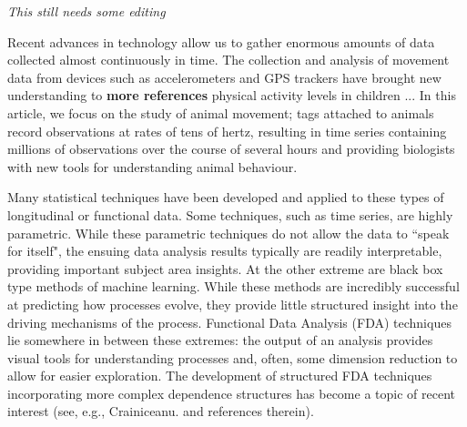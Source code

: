 


{\em{This still needs some editing}}

\vskip 10pt\noindent

Recent advances in technology allow us to gather enormous amounts of data collected almost continuously in time.
The collection and analysis of movement data from devices such as accelerometers and GPS trackers have brought new understanding to {\bf{more references}}  physical activity levels in children \citep{Morris:2007} ...
In this article, we focus on the study of animal movement;  tags attached to animals record observations at rates of tens of hertz, resulting in time series containing millions of observations over the course of several hours and providing biologists with new tools for understanding animal behaviour.

Many statistical techniques have been developed and applied to these types of longitudinal or functional data.  
Some techniques, such as time series, are highly parametric. 
While these parametric techniques do not allow the data to ``speak for itself", the ensuing data analysis results typically are readily interpretable, providing important subject area insights.
At the other extreme are black box type methods of machine learning.  
While these methods are incredibly successful at predicting how processes evolve, they provide little structured insight into the driving mechanisms of the process.
Functional Data Analysis (FDA) techniques lie somewhere in between these extremes: the output of an analysis provides visual tools for understanding processes and, often, some dimension reduction to allow for easier exploration.  
The development of structured FDA techniques incorporating more complex dependence structures has become a topic of recent interest  (see, e.g., Crainiceanu. and references therein).

